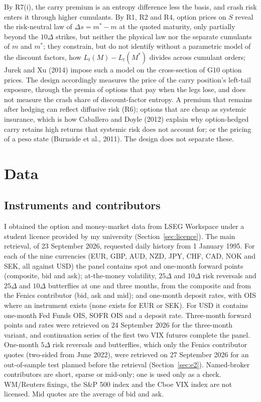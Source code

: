 \documentclass[11pt]{article}
\theoremstyle{result}
\newcommand{\D}{\Delta}
\begin{document}
By R7(i), the carry premium is an entropy difference less the basis, and crash risk enters it through higher cumulants. By R1, R2 and R4, option prices on $S$ reveal the risk-neutral law of $\D s=m^*-m$ at the quoted maturity, only partially beyond the $10\D$ strikes, but neither the physical law nor the separate cumulants of $m$ and $m^*$; they constrain, but do not identify without a parametric model of the discount factors, how $L_t(M)-L_t(M^*)$ divides across cumulant orders; Jurek and Xu (2014) impose such a model on the cross-section of G10 option prices. The design accordingly measures the price of the carry position's left-tail exposure, through the premia of options that pay when the legs lose, and does not measure the crash share of discount-factor entropy. A premium that remains after hedging can reflect diffusive risk (R6); options that are cheap as systemic insurance, which is how Caballero and Doyle (2012) explain why option-hedged carry retains high returns that systemic risk does not account for; or the pricing of a peso state (Burnside et al., 2011). The design does not separate these.

\section{Data}\label{sec:data}

\subsection{Instruments and contributors}

I obtained the option and money-market data from LSEG Workspace under a student licence provided by my university (Section~\ref{sec:licence}). The main retrieval, of 23 September 2026, requested daily history from 1 January 1995. For each of the nine currencies (EUR, GBP, AUD, NZD, JPY, CHF, CAD, NOK and SEK, all against USD) the panel contains spot and one-month forward points (composite, bid and ask); at-the-money volatility, $25\D$ and $10\D$ risk reversals and $25\D$ and $10\D$ butterflies at one and three months, from the composite and from the Fenics contributor (bid, ask and mid); and one-month deposit rates, with OIS where an instrument exists (none exists for EUR or SEK). For USD it contains one-month Fed Funds OIS, SOFR OIS and a deposit rate. Three-month forward points and rates were retrieved on 24 September 2026 for the three-month variant, and continuation series of the first two VIX futures complete the panel. One-month $5\D$ risk reversals and butterflies, which only the Fenics contributor quotes (two-sided from June 2022), were retrieved on 27 September 2026 for an out-of-sample test planned before the retrieval (Section~\ref{sec:e2}). Named-broker contributors are short, sparse or mid-only; one is used only as a check. WM/Reuters fixings, the S\&P 500 index and the Cboe VIX index are not licensed. Mid quotes are the average of bid and ask.
\end{document}
